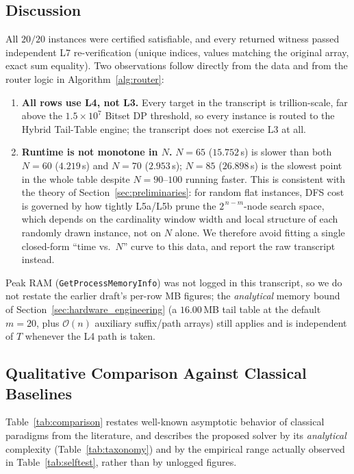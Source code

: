 \documentclass[journal,onecolumn,11pt]{IEEEtran}
\begin{document}
\subsection{Discussion}
All $20/20$ instances were certified satisfiable, and every returned witness passed independent L7 re-verification (unique indices, values matching the original array, exact sum equality). Two observations follow directly from the data and from the router logic in Algorithm~\ref{alg:router}:
\begin{enumerate}
    \item \textbf{All rows use L4, not L3.} Every target in the transcript is trillion-scale, far above the $1.5\times10^7$ Bitset DP threshold, so every instance is routed to the Hybrid Tail-Table engine; the transcript does not exercise L3 at all.
    \item \textbf{Runtime is not monotone in $N$.} $N=65$ ($15.752$\,s) is slower than both $N=60$ ($4.219$\,s) and $N=70$ ($2.953$\,s); $N=85$ ($26.898$\,s) is the slowest point in the whole table despite $N=90$--$100$ running faster. This is consistent with the theory of Section~\ref{sec:preliminaries}: for random flat instances, DFS cost is governed by how tightly L5a/L5b prune the $2^{\,n-m}$-node search space, which depends on the cardinality window width and local structure of each randomly drawn instance, not on $N$ alone. We therefore avoid fitting a single closed-form ``time vs.\ $N$'' curve to this data, and report the raw transcript instead.
\end{enumerate}
Peak RAM (\texttt{GetProcessMemoryInfo}) was not logged in this transcript, so we do not restate the earlier draft's per-row MB figures; the \emph{analytical} memory bound of Section~\ref{sec:hardware_engineering} (a $16.00$\,MB tail table at the default $m=20$, plus $\mathcal{O}(n)$ auxiliary suffix/path arrays) still applies and is independent of $T$ whenever the L4 path is taken.

\subsection{Qualitative Comparison Against Classical Baselines}
Table~\ref{tab:comparison} restates well-known asymptotic behavior of classical paradigms from the literature, and describes the proposed solver by its \emph{analytical} complexity (Table~\ref{tab:taxonomy}) and by the empirical range actually observed in Table~\ref{tab:selftest}, rather than by unlogged figures.
\end{document}
